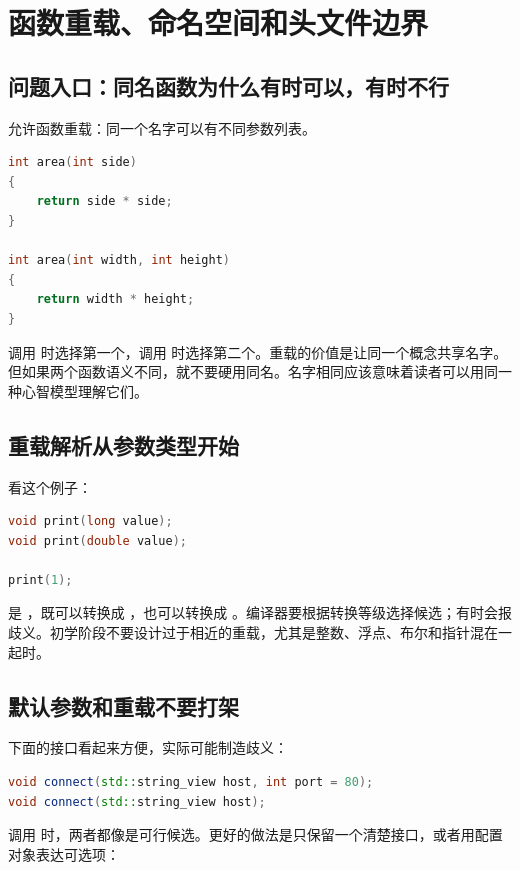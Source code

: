 \chapter{函数重载、命名空间和头文件边界}

\section{问题入口：同名函数为什么有时可以，有时不行}

\cpp 允许函数重载：同一个名字可以有不同参数列表。

\begin{lstlisting}[language=C++,caption={函数重载}]
int area(int side)
{
    return side * side;
}

int area(int width, int height)
{
    return width * height;
}
\end{lstlisting}

调用  时选择第一个，调用  时选择第二个。重载的价值是让同一个概念共享名字。但如果两个函数语义不同，就不要硬用同名。名字相同应该意味着读者可以用同一种心智模型理解它们。

\section{重载解析从参数类型开始}

看这个例子：

\begin{lstlisting}[language=C++,caption={重载可能产生歧义}]
void print(long value);
void print(double value);

print(1);
\end{lstlisting}

 是 ，既可以转换成 ，也可以转换成 。编译器要根据转换等级选择候选；有时会报歧义。初学阶段不要设计过于相近的重载，尤其是整数、浮点、布尔和指针混在一起时。

\section{默认参数和重载不要打架}

下面的接口看起来方便，实际可能制造歧义：

\begin{lstlisting}[language=C++,caption={默认参数和重载混用风险}]
void connect(std::string_view host, int port = 80);
void connect(std::string_view host);
\end{lstlisting}

调用  时，两者都像是可行候选。更好的做法是只保留一个清楚接口，或者用配置对象表达可选项：

